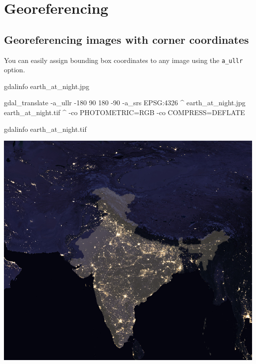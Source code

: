 \documentclass[12pt,a4paper]{article}
\newenvironment{Shaded}{\begin{snugshade}}{\end{snugshade}}
\newcommand{\ExtensionTok}[1]{#1}
\newcommand{\NormalTok}[1]{#1}
\begin{document}
\hypertarget{georeferencing}{%
\section{Georeferencing}\label{georeferencing}}

\hypertarget{georeferencing-images-with-corner-coordinates}{%
\subsection{Georeferencing images with corner
coordinates}\label{georeferencing-images-with-corner-coordinates}}

You can easily assign bounding box coordinates to any image using the
\texttt{a\_ullr} option.

\begin{Shaded}
\begin{Highlighting}[]
\ExtensionTok{gdalinfo}\NormalTok{ earth_at_night.jpg}

\ExtensionTok{gdal_translate}\NormalTok{ -a_ullr -180 90 180 -90 -a_srs EPSG:4326 ^}
  \ExtensionTok{earth_at_night.jpg}\NormalTok{ earth_at_night.tif ^}
  \ExtensionTok{-co}\NormalTok{ PHOTOMETRIC=RGB -co COMPRESS=DEFLATE}

\ExtensionTok{gdalinfo}\NormalTok{ earth_at_night.tif}
\end{Highlighting}
\end{Shaded}

\begin{center}\includegraphics{images/gdal/earth_at_night} \end{center}
\end{document}
